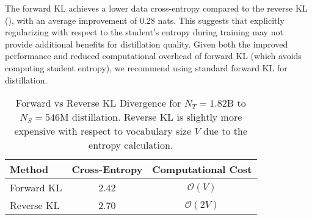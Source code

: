 The forward KL achieves a lower data cross-entropy compared to the reverse KL (), with an average improvement of 0.28 nats. This suggests that explicitly regularizing with respect to the student's entropy during training may not provide additional benefits for distillation quality. Given both the improved performance and reduced computational overhead of forward KL (which avoids computing student entropy), we recommend using standard forward KL for distillation.
\begin{table}[h]
	\centering
        \vspace{-0.1cm}
	\caption{Forward vs Reverse KL Divergence for $N_T=1.82$B to $N_S=546$M distillation. Reverse KL is slightly more expensive with respect to vocabulary size $V$ due to the entropy calculation.}
    \small
	\label{tab:kl-comparison}
	\begin{tabular}{lcc}
		\toprule
		Method     & Cross-Entropy & Computational Cost \\
		\midrule
		Forward KL & 2.42                & $\mathcal{O}(V)$   \\
		Reverse KL & 2.70                & $\mathcal{O}(2V)$  \\
		\bottomrule
	\end{tabular}
    \vspace{-0.15cm}
\end{table}



